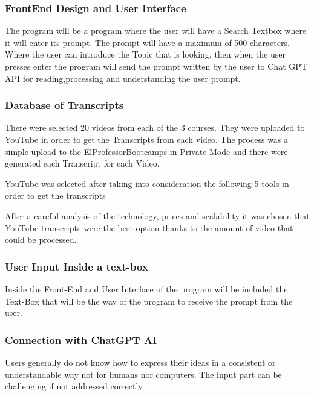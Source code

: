 \subsubsection{FrontEnd Design and User Interface}


The program will be a program where the user will have a Search Textbox where it will enter its prompt. The prompt will have a  maximum of 500 characters. Where the user can introduce the Topic that is looking, then when the user presses enter the program will send the prompt written by the user to Chat GPT API for reading,processing and understanding the user prompt. 

\subsubsection{Database of Transcripts}

There were selected 20 videos from each of the 3 courses. They were uploaded to YouTube in order to get the Transcripts from each video.
The process was a simple upload to the ElProfessorBootcamps in Private Mode and there were generated each Transcript for each Video.


YouTube was selected after taking into consideration the following 5 tools in order to get the transcripts






After a careful analysis of the technology, prices and scalability it was chosen that YouTube transcripts were the best option thanks to the amount of video that could be processed.






\subsubsection{User Input Inside a text-box}


Inside the Front-End and User Interface of the program will be included the Text-Box that will be the way of the program to receive the prompt from the user.


\subsubsection{Connection with ChatGPT AI}


Users generally do not know how to express their ideas in a consistent or understandable way not for humans nor computers. The input part can be challenging if not addressed correctly. 

